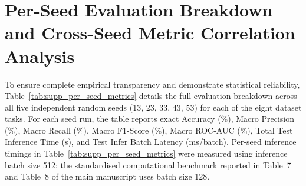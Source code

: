 \documentclass[a4paper,fleqn]{cas-sc}
\begin{document}
\section{Per-Seed Evaluation Breakdown and Cross-Seed Metric Correlation Analysis}
\label{sec:supp_per_seed_eval}
To ensure complete empirical transparency and demonstrate statistical reliability, Table~\ref{tab:supp_per_seed_metrics} details the full evaluation breakdown across all five independent random seeds (13, 23, 33, 43, 53) for each of the eight dataset tasks. For each seed run, the table reports exact Accuracy (\%), Macro Precision (\%), Macro Recall (\%), Macro F1-Score (\%), Macro ROC-AUC (\%), Total Test Inference Time (s), and Test Infer Batch Latency (ms/batch). Per-seed inference timings in Table~\ref{tab:supp_per_seed_metrics} were measured using inference batch size 512; the standardised computational benchmark reported in Table~7 and Table~8 of the main manuscript uses batch size 128.
\end{document}
